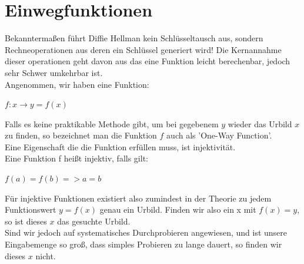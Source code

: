 \documentclass[a4paper,12pt]{scrartcl}
\begin{document}
\section{Einwegfunktionen}

Bekanntermaßen führt Diffie Hellman kein Schlüsseltausch aus, sondern  Rechneoperationen aus deren ein Schlüssel generiert wird!
Die Kernannahme dieser operationen geht davon aus das eine Funktion leicht berechenbar, jedoch sehr Schwer umkehrbar ist.\\
Angenommen, wir haben eine Funktion:
\\ 
                               \begin{center}
                               $f: x \rightarrow y = f(x)$ 
  
                               \end{center}
                               
Falls es keine praktikable Methode gibt, um bei gegebenem $y$ wieder das Urbild $x$ zu finden,
so bezeichnet man die Funktion $f$ auch als 'One-Way Function'.\\ Eine Eigenschaft die die Funktion erfüllen muss, ist injektivität.\\
Eine Funktion f heißt injektiv, falls gilt:\\

							\begin{center}
							 $f(a) = f(b) => a = b$ \\

							\end{center}

Für injektive Funktionen existiert also zumindest in der Theorie zu jedem
Funktionswert $y = f(x)$ genau ein Urbild. Finden wir also ein x mit $f(x) = y$, so ist
dieses $x$ das gesuchte Urbild.\\
Sind wir jedoch auf systematisches Durchprobieren angewiesen, und ist
unsere Eingabemenge so groß, dass simples Probieren zu lange dauert, so
finden wir dieses $x$ nicht.
\newpage
\end{document}
